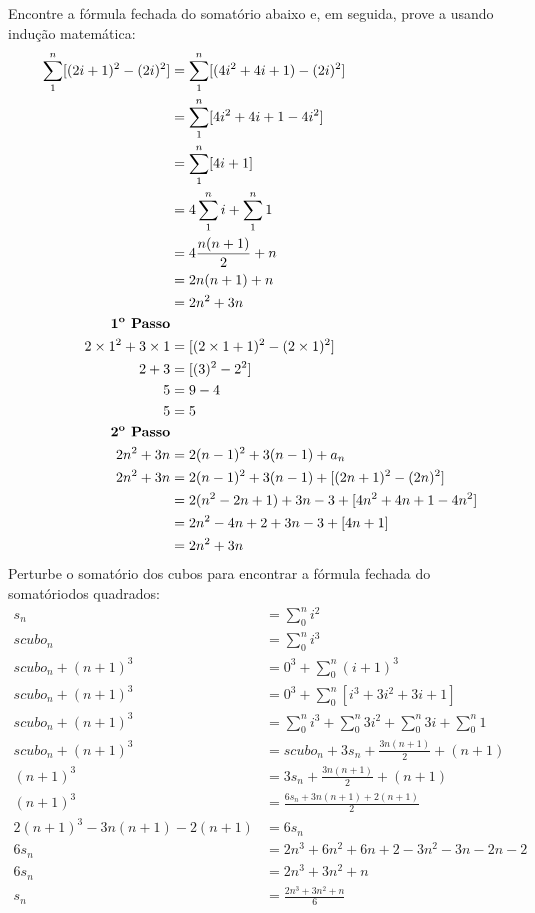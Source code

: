 \documentclass{article}
\begin{document}
Encontre a fórmula fechada do somatório abaixo e, em seguida, prove a usando indução matemática:
\begin{equation}
    \begin{aligned}
     \sum_1^n [(2i + 1)^2 - (2i)^2] &= \sum_1^n [(4i^2 + 4i + 1) - (2i)^2] \\
     &= \sum_1^n [4i^2 + 4i + 1 - 4i^2] \\
     &= \sum_1^n [4i + 1] \\
     &= 4\sum_1^n i + \sum_1^n1 \\
     &= 4 \frac{n(n+1)}{2} + n \\
     &= 2n(n+1) + n \\
     &= 2n^2 + 3n \\
     \textbf{1\textsuperscript{o} Passo} \\
     2\times1^2 + 3\times1 &= [(2\times1 + 1)^2 - (2\times1)^2] \\
     2 + 3 &= [(3)^2 - 2^2] \\
     5 &= 9 - 4 \\
     5 &= 5 \\
     \textbf{2\textsuperscript{o} Passo} \\
     2n^2 + 3n &= 2(n-1)^2 + 3(n-1) + a_n \\
     2n^2 + 3n &= 2(n-1)^2 + 3(n-1) + [(2n + 1)^2 - (2n)^2] \\
            &= 2(n^2 - 2n + 1) + 3n - 3 + [4n^2 + 4n + 1 - 4n^2] \\
            &= 2n^2 - 4n + 2 + 3n - 3 + [4n + 1] \\
            &= 2n^2 + 3n \\
    \end{aligned}
\end{equation}
Perturbe o somatório dos cubos para encontrar a fórmula fechada do somatóriodos quadrados:
\begin{equation}
    \begin{aligned}
    s_n &= \sum_0^n i^2 \\
    scubo_n &= \sum_0^n i^3 \\
    scubo_{n} + (n+1)^3 &= 0^3 + \sum_0^n (i+1)^3 \\
    scubo_{n} + (n+1)^3 &= 0^3 + \sum_0^n [i^3 + 3i^2 + 3i + 1] \\
    scubo_{n} + (n+1)^3 &= \sum_0^n i^3 + \sum_0^n 3i^2 + \sum_0^n 3i + \sum_0^n 1 \\
   scubo_{n} + (n+1)^3 &= scubo_n + 3s_n + \frac{3n(n+1)}{2} + (n+1) \\
   (n+1)^3 &= 3s_n + \frac{3n(n+1)}{2} + (n+1) \\
   (n+1)^3 &= \frac{6s_n + 3n(n+1) + 2(n+1)}{2} \\
   2(n+1)^3 - 3n(n+1) - 2(n+1) &= 6s_n \\
   6s_n &= 2n^3 + 6n^2 + 6n + 2 - 3n^2 - 3n - 2n -2 \\
   6s_n &= 2n^3 + 3n^2 + n\\
   s_n &= \frac{2n^3 + 3n^2 + n}{6}\\
    \end{aligned}
\end{equation}
\end{document}
